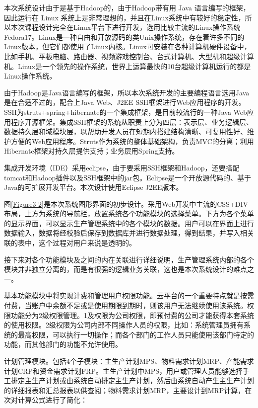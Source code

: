 \documentclass{Proposal}
\begin{document}

本次系统设计由于是基于Hadoop的，由于Hadoop带有用 Java 语言编写的框架，因此运行在 Linux 系统上是非常理想的，并且在Linux系统中有较好的稳定性，所以本次课程设计完全在Linux平台下进行开发，选用比较主流的Linux操作系统Fedora17。Linux是一种自由和开放源码的类Unix操作系统，存在着许多不同的Linux版本，但它们都使用了Linux内核。Linux可安装在各种计算机硬件设备中，比如手机、平板电脑、路由器、视频游戏控制台、台式计算机、大型机和超级计算机。Linux是一个领先的操作系统，世界上运算最快的10台超级计算机运行的都是Linux操作系统。

由于Hadoop是Java语言编写的框架，所以本次系统开发的主要编程语言选用Java是在合适不过的，配合上Java Web、J2EE SSH框架进行Web应用程序的开发。SSH为struts+spring+hibernate的一个集成框架，是目前较流行的一种Java Web应用程序开源框架。集成SSH框架的系统从职责上分为四层：表示层、业务逻辑层、数据持久层和域模块层，以帮助开发人员在短期内搭建结构清晰、可复用性好、维护方便的Web应用程序。Struts作为系统的整体基础架构，负责MVC的分离；利用Hibernate框架对持久层提供支持；业务层用Spring支持。

集成开发环境（IDE）采用eclipse，由于要采用SSH框架和Hadoop，还要搭配tomcat和Hadoop插件以及SSH框架中的jar包。Eclipse是一个开放源代码的、基于Java的可扩展开发平台。本次设计使用Eclipse J2EE版本。

图\ref{Figure3-2}是本次系统图形界面的初步设计。采用Web开发中主流的CSS+DIV布局，上方为系统的导航栏，放置系统各个功能模块的选择菜单。下方为各个菜单的显示界面，可以显示生产管理系统中的各个模块的数据。用户可以在界面上进行数据输入，数据将经校验后保存到数据库并进行数据处理，得到结果，并写入相关联的表中，这个过程对用户来说是透明的。


接下来对各个功能模块及之间的内在关联进行详细说明，生产管理系统内部的各个模块并非独立分离的，而是有很强的逻辑业务关联，这也是本次系统设计的难点之一。

基本功能模块中将实现计费和管理用户权限功能。云平台的一个重要特点就是按需付费，当账户中余额不足或是使用期限到期时，则该用户无法继续使用该系统。权限功能分为2级权限管理。1及权限为公司权限，即预付费的公司才能获得本套系统的使用权限。2级权限为公司内部不同操作人员的权限，比如：系统管理员拥有系统的最高权限，可以执行一切操作；而各个部门的工作人员只能使用该部门特定的功能，而其他部门的功能不允许使用。

计划管理模块。包括4个子模块：主生产计划MPS、物料需求计划MRP、产能需求计划CRP和资金需求计划FRP。主生产计划中MPS，用户或管理人员能够选择手工排定主生产计划或由系统自动排定主生产计划，然后由系统自动产生主生产计划的详细报表和汇总报表以供查阅；物料需求计划MRP，主要设计到MRP计算，在次对计算公式进行了简化：
\end{document}
